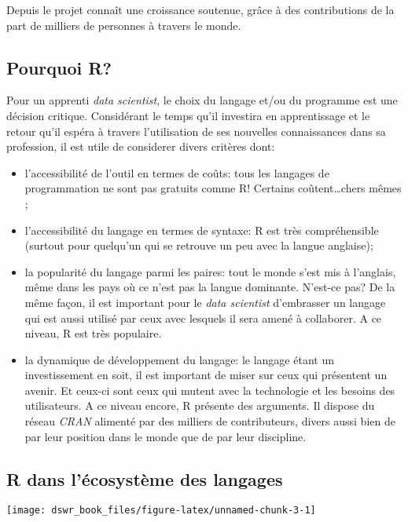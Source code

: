 \documentclass[]{book}
\begin{document}
Depuis le projet connaît une croissance soutenue, grâce à des
contributions de la part de milliers de personnes à travers le monde.

\subsection{Pourquoi R?}\label{pourquoi-r}

Pour un apprenti \emph{data scientist}, le choix du langage et/ou du
programme est une décision critique. Considérant le temps qu'il
investira en apprentissage et le retour qu'il espéra à travers
l'utilisation de ses nouvelles connaissances dans sa profession, il est
utile de considerer divers critères dont:

\begin{itemize}
\item
  l'accessibilité de l'outil en termes de coûts: tous les langages de
  programmation ne sont pas gratuits comme R! Certains
  coûtent\ldots{}chers mêmes ;
\item
  l'accessibilité du langage en termes de syntaxe: R est très
  compréhensible (surtout pour quelqu'un qui se retrouve un peu avec la
  langue anglaise);
\item
  la popularité du langage parmi les paires: tout le monde s'est mis à
  l'anglais, même dans les pays où ce n'est pas la langue dominante.
  N'est-ce pas? De la même façon, il est important pour le \emph{data
  scientist} d'embrasser un langage qui est aussi utilisé par ceux avec
  lesquels il sera amené à collaborer. A ce niveau, R est très
  populaire.
\item
  la dynamique de développement du langage: le langage étant un
  investissement en soit, il est important de miser sur ceux qui
  présentent un avenir. Et ceux-ci sont ceux qui mutent avec la
  technologie et les besoins des utilisateurs. A ce niveau encore, R
  présente des arguments. Il dispose du réseau \emph{CRAN} alimenté par
  des milliers de contributeurs, divers aussi bien de par leur position
  dans le monde que de par leur discipline.
\end{itemize}

\subsection{R dans l'écosystème des
langages}\label{r-dans-lecosysteme-des-langages}

\texttt{[image: dswr\_book\_files/figure-latex/unnamed-chunk-3-1]}
\end{document}
